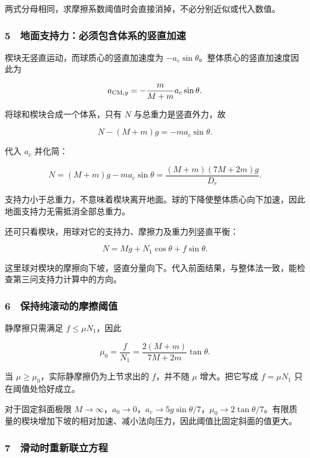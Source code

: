 \documentclass[12pt,a4paper,fontset=fandol]{ctexart}
\begin{document}
两式分母相同，求摩擦系数阈值时会直接消掉，不必分别近似或代入数值。

\subsubsection{5　地面支持力：必须包含体系的竖直加速}\label{ux5730ux9762ux652fux6301ux529bux5fc5ux987bux5305ux542bux4f53ux7cfbux7684ux7ad6ux76f4ux52a0ux901f}

楔块无竖直运动，而球质心的竖直加速度为
\(-a_c\sin\theta\)。整体质心的竖直加速度因此为

\[a_{{\rm CM},y}=-\frac{m}{M+m}a_c\sin\theta.\]

将球和楔块合成一个体系，只有 \(N\) 与总重力是竖直外力，故

\[N-(M+m)g=-ma_c\sin\theta.\]

代入 \(a_c\) 并化简：

\[\boxed{N=(M+m)g-ma_c\sin\theta
=\frac{(M+m)(7M+2m)g}{D_r}.}\]

支持力小于总重力，不意味着楔块离开地面。球的下降使整体质心向下加速，因此地面支持力无需抵消全部总重力。

还可只看楔块，用球对它的支持力、摩擦力及重力列竖直平衡：

\[N=Mg+N_1\cos\theta+f\sin\theta.\]

这里球对楔块的摩擦向下坡，竖直分量向下。代入前面结果，与整体法一致，能检查第三问支持力计算中的方向。

\subsubsection{6　保持纯滚动的摩擦阈值}\label{ux4fddux6301ux7eafux6edaux52a8ux7684ux6469ux64e6ux9608ux503c}

静摩擦只需满足 \(f\le\mu N_1\)，因此

\[\mu_0=\frac f{N_1}
=\boxed{\frac{2(M+m)}{7M+2m}\tan\theta.}\]

当 \(\mu\ge\mu_0\)，实际静摩擦仍为上节求出的 \(f\)，并不随 \(\mu\)
增大。把它写成 \(f=\mu N_1\) 只在阈值处恰好成立。

对于固定斜面极限
\(M\to\infty\)，\(a_0\to0\)，\(a_c\to5g\sin\theta/7\)，\(\mu_0\to2\tan\theta/7\)。有限质量的楔块增加下坡的相对加速、减小法向压力，因此阈值比固定斜面的值更大。

\subsubsection{7　滑动时重新联立方程}\label{ux6ed1ux52a8ux65f6ux91cdux65b0ux8054ux7acbux65b9ux7a0b}
\end{document}
